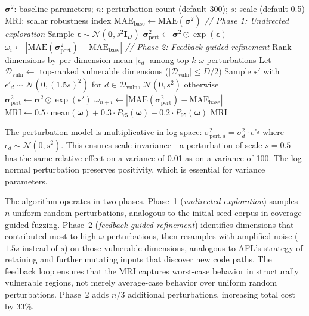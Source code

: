 \documentclass[manuscript,review,anonymous]{acmart}
\newcommand{\MAE}{\mathrm{MAE}}
\newcommand{\MRI}{\mathrm{MRI}}
\begin{document}
\begin{algorithm}[t]
\caption{ModelRobustnessIndex$(\boldsymbol{\sigma}^2, n, s)$}
\label{alg:mri}
\begin{algorithmic}[1]
\REQUIRE $\boldsymbol{\sigma}^2$: baseline parameters; $n$: perturbation count (default 300); $s$: scale (default 0.5)
\ENSURE $\MRI$: scalar robustness index
\STATE $\MAE_{\mathrm{base}} \leftarrow \MAE(\boldsymbol{\sigma}^2)$
\STATE \textit{// Phase 1: Undirected exploration}
    \STATE Sample $\boldsymbol{\epsilon} \sim \mathcal{N}(\mathbf{0}, s^2 \mathbf{I}_D)$
    \STATE $\boldsymbol{\sigma}_{\mathrm{pert}}^2 \leftarrow \boldsymbol{\sigma}^2 \odot \exp(\boldsymbol{\epsilon})$ 
    \STATE $\omega_i \leftarrow |\MAE(\boldsymbol{\sigma}_{\mathrm{pert}}^2) - \MAE_{\mathrm{base}}|$
\ENDFOR
\STATE \textit{// Phase 2: Feedback-guided refinement}
\STATE Rank dimensions by per-dimension mean $|\epsilon_d|$ among top-$k$ $\omega$ perturbations
\STATE Let $\mathcal{D}_{\mathrm{vuln}} \leftarrow$ top-ranked vulnerable dimensions ($|\mathcal{D}_{\mathrm{vuln}}| \leq D/2$)
    \STATE Sample $\boldsymbol{\epsilon}'$ with $\epsilon'_d \sim \mathcal{N}(0, (1.5s)^2)$ for $d \in \mathcal{D}_{\mathrm{vuln}}$, $\mathcal{N}(0, s^2)$ otherwise
    \STATE $\boldsymbol{\sigma}_{\mathrm{pert}}^2 \leftarrow \boldsymbol{\sigma}^2 \odot \exp(\boldsymbol{\epsilon}')$
    \STATE $\omega_{n+i} \leftarrow |\MAE(\boldsymbol{\sigma}_{\mathrm{pert}}^2) - \MAE_{\mathrm{base}}|$
\ENDFOR
\STATE $\MRI \leftarrow 0.5 \cdot \mathrm{mean}(\boldsymbol{\omega}) + 0.3 \cdot P_{75}(\boldsymbol{\omega}) + 0.2 \cdot P_{95}(\boldsymbol{\omega})$
\RETURN $\MRI$
\end{algorithmic}
\end{algorithm}

The perturbation model is multiplicative in log-space: $\sigma_{\mathrm{pert},d}^2 = \sigma_d^2 \cdot e^{\epsilon_d}$ where $\epsilon_d \sim \mathcal{N}(0, s^2)$.
This ensures scale invariance---a perturbation of scale $s = 0.5$ has the same relative effect on a variance of 0.01 as on a variance of 100.
The log-normal perturbation preserves positivity, which is essential for variance parameters.

The algorithm operates in two phases.
Phase~1 (\emph{undirected exploration}) samples $n$ uniform random perturbations, analogous to the initial seed corpus in coverage-guided fuzzing.
Phase~2 (\emph{feedback-guided refinement}) identifies dimensions that contributed most to high-$\omega$ perturbations, then resamples with amplified noise ($1.5 s$ instead of $s$) on those vulnerable dimensions, analogous to AFL's strategy of retaining and further mutating inputs that discover new code paths.
The feedback loop ensures that the MRI captures worst-case behavior in structurally vulnerable regions, not merely average-case behavior over uniform random perturbations.
Phase~2 adds $n/3$ additional perturbations, increasing total cost by 33\%.
\end{document}
